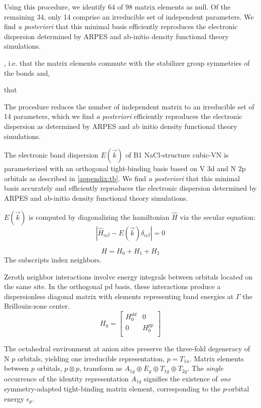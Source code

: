 \documentclass[preprint,showpacs,preprintnumbers,superscriptaddress,prb,floatfix,aps]{revtex4-1}
\newcommand*{\ham}{\hat{H}}
\begin{document}

Using this procedure, we identify 64 of 98 matrix elements as null. Of the remaining 34, only 14 comprise an irreducible set of independent parameters. We find \emph{a posteriori} that this minimal basis efficiently reproduces the electronic dispersion determined by ARPES and ab-initio density functional theory simulations.

, i.e. that the matrix elements commute with the stabilizer group symmetries of the bonds and,

 that 

The procedure reduces the number of independent matrix to an irreducible set of 14 parameters, which we find \emph{a posteriori} efficiently reproduces the electronic dispersion as determined by ARPES and ab initio density functional theory simulations.

The electronic band dispersion $E(\vec{k})$ of B1 NaCl-structure cubic-VN is parameterized with an orthogonal tight-binding basis based on V 3d and N 2p orbitals as described in \ref{appendix:tb}. We find \emph{a posteriori} that this minimal basis accurately and efficiently reproduces the electronic dispersion determined by ARPES and ab-initio density functional theory simulations.

$E(\vec{k})$ is computed by diagonalizing the hamiltonian $\ham$ via the secular equation:
\begin{equation}
\left| \ham_{\alpha\beta} - E(\vec{k}) \delta_{\alpha\beta} \right| = 0
\end{equation}



\begin{equation}
H = H_0 + H_1 + H_2
\end{equation}
The subscripts index neighbors.

Zeroth neighbor interactions involve energy integrals between orbitals located on the same site. In the orthogonal pd basis, these interactions produce a dispersionless diagonal matrix with elements representing band energies at $\Gamma$ the Brillouin-zone center. 
\begin{equation}
H_0 =
\begin{bmatrix}
H_0^{dd} & 0 \\
 0 & H_0^{pp} \\
\end{bmatrix}
\end{equation}

The octahedral environment at anion sites preserve the three-fold degeneracy of N $p$ orbitals, yielding one irreducible representation, $p = T_{1u}$. Matrix elements between $p$ orbitals, $p \otimes p$, transform as $A_{1g} \oplus E_g \oplus T_{1g} \oplus T_{2g}$. The \emph{single} occurrence of the identity representation $A_{1g}$ signifies the existence of \emph{one} symmetry-adapted tight-binding matrix element, corresponding to the $p$-orbital energy $\epsilon_p$.
\end{document}

